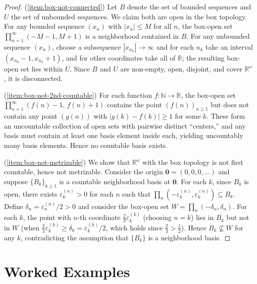 \documentclass[11pt,a4paper,twoside]{book}
\theoremstyle{remark}
\theoremstyle{definition}
\theoremstyle{definition}
\begin{document}
\begin{proof}
(\ref{item:box-not-connected})\;
Let $B$ denote the set of bounded sequences and $U$ the set of
unbounded sequences.  We claim both are open in the box topology.
For any bounded sequence $(x_n)$ with $|x_n|\le M$ for all $n$,
the box-open set $\prod_{n=1}^{\infty}(-M-1,M+1)$ is a neighborhood
contained in $B$.  For any unbounded sequence $(x_n)$, choose a
subsequence $|x_{n_k}|\to\infty$ and for each $n_k$ take an interval
$(x_{n_k}-1,x_{n_k}+1)$, and for other coordinates take all
of $\mathbb{R}$; the resulting box-open set lies within $U$.
Since $B$ and $U$ are non-empty, open, disjoint, and cover
$\mathbb{R}^\omega$, it is disconnected.

\medskip\noindent
(\ref{item:box-not-2nd-countable})\;
For each function $f\colon\mathbb{N}\to\mathbb{R}$, the box-open set
$\prod_{n=1}^{\infty}(f(n)-1,\,f(n)+1)$ contains the point
$(f(n))_{n\ge 1}$ but does not contain any point $(g(n))$ with
$|g(k)-f(k)|\ge 1$ for some $k$.  These form an uncountable collection
of open sets with pairwise distinct ``centers,'' and any basis must
contain at least one basis element inside each, yielding uncountably
many basis elements.  Hence no countable basis exists.

\medskip\noindent
(\ref{item:box-not-metrizable})\;
We show that $\mathbb{R}^\omega$ with the box topology is not
first countable, hence not metrizable.  Consider the origin
$\mathbf{0}=(0,0,0,\dots)$ and suppose $\{B_k\}_{k\ge 1}$ is a
countable neighborhood basis at $\mathbf{0}$.  For each $k$, since
$B_k$ is open, there exists $\varepsilon_k^{(n)}>0$ for each $n$
such that
$\prod_{n}(-\varepsilon_k^{(n)},\varepsilon_k^{(n)})\subseteq B_k$.
Define $\delta_n=\varepsilon_n^{(n)}/2>0$ and consider the box-open
set $W=\prod_{n}(-\delta_n,\delta_n)$.  For each $k$, the point with
$n$-th coordinate $\frac{2}{3}\varepsilon_k^{(k)}$ (choosing $n=k$)
lies in $B_k$ but not in $W$ (when $\frac{2}{3}\varepsilon_k^{(k)}
\ge\delta_k=\varepsilon_k^{(k)}/2$, which holds since
$\frac{2}{3}>\frac{1}{2}$).  Hence $B_k\not\subseteq W$ for any $k$,
contradicting the assumption that $\{B_k\}$ is a neighborhood basis.
\end{proof}


\section{Worked Examples}\label{sec:product-quotient-examples}
\end{document}
